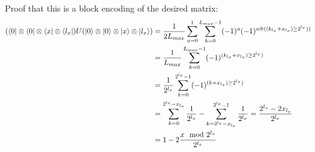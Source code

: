 \documentclass{revtex4-2}
\begin{document}
Proof that this is a block encoding of the desired matrix:
\begin{align}(\bra{0}\otimes\bra{0}\otimes\bra{x}\otimes\bra{l_x}) U (\ket{0}\otimes\ket{0}\otimes\ket{x}\otimes\ket{l_x}) &=  \frac{1}{2L_{max}}\sum_{a=0}^1\sum_{k=0}^{L_{max}-1} (-1)^a (-1)^{a \oplus ((k_{l_x}+x_{l_x})\ge 2^{l_x}))}\\
&= \frac{1}{L_{max}}\sum_{k=0}^{L_{max}-1}  (-1)^{(k_{l_x}+x_{l_x})\ge 2^{l_x})}\\
&= \frac{1}{2^{l_x}}\sum_{k=0}^{2^{l_x}-1} (-1)^{(k+x_{l_x})\ge 2^{l_x})} \\
&= \sum_{k=0}^{2^{l_x}-x_{l_x}} \frac{1}{2^{l_x}}-\sum_{k=2^{l_x}-x_{l_x}}^{2^{l_x}-1} \frac{1}{2^{l_x}} = \frac{2^{l_x}-2x_{l_x}}{2^{l_x}}\\
&= 1 - 2\frac{x \mod 2^{l_x}}{2^{l_x}}
\end{align}
\end{document}
